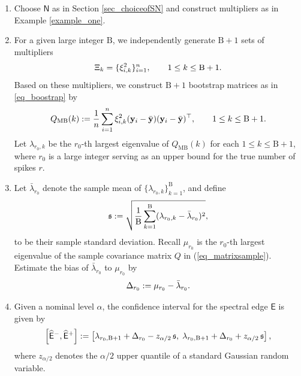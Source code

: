 \documentclass[12pt]{article}
\def\sN{\mathsf N}
\def\yb{\mathbf y}
\theoremstyle{plain}
\numberwithin{equation}{section}
\begin{document}
\begin{enumerate}
	\item Choose $\sN$ as in Section \ref{sec_choiceofSN} and construct multipliers as in Example \ref{example_one}. 
	\item For a given large integer $\mathrm{B}$, we independently generate $\mathrm{B}+1$ sets of multipliers \vspace*{-10pt}
	\begin{equation}\label{eq_multipliernumberofB}
		\vspace*{-10pt}
		\Xi_k = \{\xi^2_{i,k}\}_{i=1}^n, \qquad 1 \leq k \leq \mathrm{B}+1.
	\end{equation}
	Based on these multipliers, we construct $\mathrm{B}+1$ bootstrap matrices as in \eqref{eq_boostrap} by \vspace*{-10pt}
	\begin{equation*}
		\vspace*{-10pt}
		Q_{\mathrm{MB}}(k) := \frac{1}{n}\sum_{i=1}^n \xi^2_{i,k} (\yb_i-\bar{\yb}) (\yb_i-\bar{\yb})^\top, 
		\qquad 1 \leq k \leq \mathrm{B}+1.
	\end{equation*}
	Let $\lambda_{r_0,k}$ be the $r_0$-th largest eigenvalue of $Q_{\mathrm{MB}}(k)$ for each $1 \leq k \leq \mathrm{B}+1$, where $r_0$ is a  large integer serving as an upper bound for the true number of spikes $r$.
	\item Let $\bar{\lambda}_{r_0}$ denote the sample mean of $\{\lambda_{r_0,k}\}_{k=1}^{\mathrm{B}}$, and define \vspace*{-10pt}
	\begin{equation*}
		\vspace*{-10pt}
		\mathfrak{s}:=\sqrt{\frac{1}{\mathrm{B}}\sum_{k=1}^{\mathrm{B}}(\lambda_{r_0,k}-\bar{\lambda}_{r_0})^2},
	\end{equation*}
	to be their sample standard deviation. Recall $\mu_{r_0}$ is the $r_0$-th largest eigenvalue of the sample covariance matrix  $Q$ in (\ref{eq_matrixsample}). Estimate the bias of $\bar{\lambda}_{r_0}$ to $\mu_{r_0}$ by \vspace*{-10pt} \begin{equation}\label{eq_correctionterm}
		\vspace*{-10pt}
		\Delta_{r_0}:=\mu_{r_0}-\bar{\lambda}_{r_0}.
	\end{equation} 
	\item Given a nominal level $\alpha$, the confidence interval for the spectral edge $\mathsf{E}$ is given by \vspace*{-10pt}
	\begin{equation}\label{eq_CI}
		\vspace*{-10pt}
		\left[ \widehat{\mathsf{E}}^-,   \widehat{\mathsf{E}}^+\right]:=\left[ 
		\lambda_{r_0,\mathrm{B}+1} +\Delta_{r_0}- z_{\alpha/2}\,{\mathfrak{s}}, \;
		\lambda_{r_0,\mathrm{B}+1} 
		+\Delta_{r_0}+ z_{\alpha/2}\,\mathfrak{s}
		\right],
	\end{equation}
	where $z_{\alpha/2}$ denotes the $\alpha/2$ upper quantile of a standard Gaussian random variable.
\end{enumerate}
\end{document}
